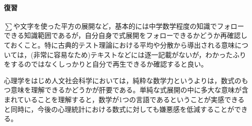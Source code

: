 \paragraph{復習}
$\sum$や文字を使った平方の展開など，基本的には中学数学程度の知識でフォローできる知識範囲であるが，自分自身で式展開をフォローできるかどうか再確認しておくこと。特に古典的テスト理論における平均や分散から導出される意味については，(非常に容易なため)テキストなどには逐一記載がないが，わかったふりをするのではなくしっかりと自分で再生できるか確認すると良い。

心理学をはじめ人文社会科学においては，純粋な数学力というよりは，数式のもつ意味を理解できるかどうかが肝要である。単純な式展開の中に多大な意味が含まれていることを理解すると，数学が1つの言語であるということが実感できると同時に，今後の心理統計における数式に対しても嫌悪感を低減することができる。
